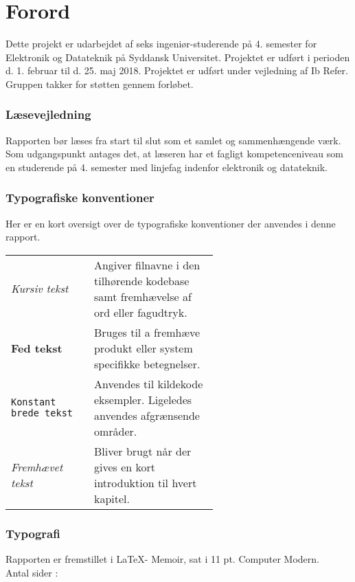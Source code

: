 \chapter*{Forord}\label{chap:forord}
Dette projekt er udarbejdet af seks ingeniør-studerende på 4. semester for Elektronik og Datateknik på Syddansk Universitet. 
Projektet er udført i perioden d. 1. februar til d. 25. maj 2018. 
Projektet er udført under vejledning af Ib Refer. Gruppen takker for støtten gennem forløbet. 


\subsection{Læsevejledning}
Rapporten bør læses fra start til slut som et samlet og sammenhængende værk. 
Som udgangspunkt antages det, at læseren har et fagligt kompetenceniveau som en studerende på 4. semester med linjefag indenfor elektronik og datateknik.

\subsection{Typografiske konventioner}
Her er en kort oversigt over de typografiske konventioner der anvendes i denne rapport.

\bigskip

\begin{tabular}{l p{0.6\linewidth}}
	\textit{Kursiv tekst}			& Angiver filnavne i den tilhørende kodebase samt fremhævelse af ord eller fagudtryk. \\
	\textbf{Fed tekst}				& Bruges til a fremhæve produkt eller system specifikke betegnelser.\\
	\texttt{Konstant brede tekst}	& Anvendes til kildekode eksempler. Ligeledes anvendes afgrænsende områder.\\
	\emph{Fremhævet tekst}		    & Bliver brugt når der gives en kort introduktion til hvert kapitel.\\
\end{tabular}

\subsection{Typografi}
Rapporten er fremstillet i \LaTeX - Memoir, sat i 11 pt. Computer Modern.\\
Antal sider : \pageref{LastPage}